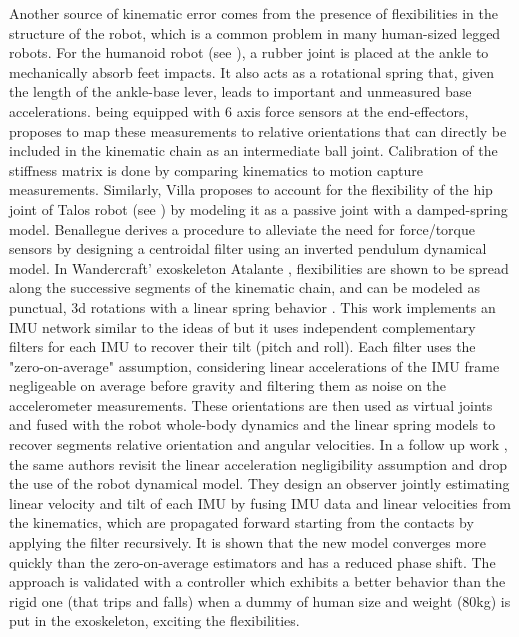 Another source of kinematic error comes from the presence of flexibilities in the structure of the robot, which is a common problem in many human-sized legged robots. 
For the  humanoid robot (see ), a rubber joint is placed at the ankle to mechanically absorb feet impacts. 
It also acts as a rotational spring that, given the length of the ankle-base lever, 
leads to important and unmeasured base accelerations.  being equipped with 6 axis 
force sensors at the end-effectors, \cite{flayols2017experimental} proposes to map these measurements to relative orientations that can 
directly be included in the kinematic chain as an intermediate ball joint. Calibration of the stiffness matrix is done by comparing 
kinematics to motion capture measurements. Similarly, Villa \cite{villa2022addressing} proposes to account for the flexibility of the hip joint of Talos robot 
\cite{stasse2017talos} (see ) by modeling it as a passive joint with a damped-spring model.
Benallegue \cite{benallegue2015estimation} derives a procedure to alleviate the need for force/torque sensors by 
designing a centroidal filter using an inverted pendulum dynamical model. 
In Wandercraft' exoskeleton Atalante \cite{harib2018feedback}, flexibilities
are shown to be spread along the successive segments of the kinematic chain, and can be modeled as punctual, 
3d rotations with a linear spring behavior \cite{vigne2018estimation}. This work implements an IMU network similar to the ideas of 
\cite{xinjilefu2016distributed,rotella2016imu} but it uses independent complementary filters for each IMU to recover their tilt (pitch and roll). 
Each filter uses the "zero-on-average" assumption, considering linear accelerations of the IMU frame negligeable on average before gravity and 
filtering them as noise on the accelerometer measurements. These orientations are then used as virtual joints and fused with the robot whole-body dynamics and the linear spring models to recover segments 
relative orientation and angular velocities. In a follow up work \cite{vigne2022movie}, the same authors revisit the linear acceleration negligibility 
assumption and drop the use of the robot dynamical model. They design an observer jointly estimating linear velocity and tilt 
of each IMU by fusing IMU data and linear velocities from the kinematics, which are propagated forward starting from the contacts by applying the filter recursively. 
It is shown that the new model converges more quickly than the zero-on-average estimators and has a reduced phase shift. 
The approach is validated with a controller which exhibits a better behavior than the rigid one (that trips and falls) when a dummy of human size and weight 
(80kg) is put in the exoskeleton, exciting the flexibilities. 

